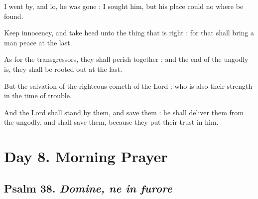 I went by, and lo, he was gone : I sought him, but his place could no where be found.\par
{}Keep innocency, and take heed unto the thing that is right : for that shall bring a man peace at the last.\par
{}As for the transgressors, they shall perish together : and the end of the ungodly is, they shall be rooted out at the last.\par
{}But the salvation of the righteous cometh of the Lord : who is also their strength in the time of trouble.\par
{}And the Lord shall stand by them, and save them : he shall deliver them from the ungodly, and shall save them, because they put their trust in him.\par


\section*{Day 8. Morning Prayer}

\subsection{Psalm 38. \textit{Domine, ne in furore}}

